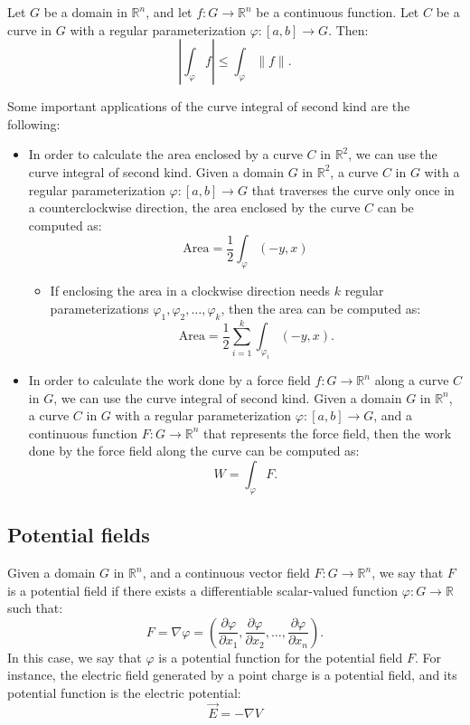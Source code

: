 \begin{prop}
    Let $G$ be a domain in $\mathbb{R}^n$, and let $f : G \to \mathbb{R}^n$ be a continuous function. Let $C$ be a curve in $G$ with a regular parameterization $\varphi : [a, b] \to G$. Then:
    \[
        \left|\int_\varphi f\right| \leq \int_\varphi \|f\|.
    \]
\end{prop}


Some important applications of the curve integral of second kind are the following:
\begin{itemize}
    \item In order to calculate the area enclosed by a curve $C$ in $\mathbb{R}^2$, we can use the curve integral of second kind. Given a domain $G$ in $\mathbb{R}^2$, a curve $C$ in $G$ with a regular parameterization $\varphi : [a, b] \to G$ that traverses the curve only once in a counterclockwise direction, the area enclosed by the curve $C$ can be computed as:
    \[
        \text{Area} = \frac{1}{2} \int_\varphi (-y,x)
    \]
    \begin{itemize}
        \item If enclosing the area in a clockwise direction needs $k$ regular parameterizations $\varphi_1, \varphi_2, \dots, \varphi_k$, then the area can be computed as:
        \[
            \text{Area} = \frac{1}{2} \sum_{i=1}^k \int_{\varphi_i} (-y,x).
        \]
    \end{itemize}

    \item In order to calculate the work done by a force field $f : G \to \mathbb{R}^n$ along a curve $C$ in $G$, we can use the curve integral of second kind. Given a domain $G$ in $\mathbb{R}^n$, a curve $C$ in $G$ with a regular parameterization $\varphi : [a, b] \to G$, and a continuous function $F : G \to \mathbb{R}^n$ that represents the force field, then the work done by the force field along the curve can be computed as:
    \[
        W = \int_\varphi F.
    \]
\end{itemize}


\subsection{Potential fields}

Given a domain $G$ in $\mathbb{R}^n$, and a continuous vector field $F : G \to \mathbb{R}^n$, we say that $F$ is a potential field if there exists a differentiable scalar-valued function $\varphi : G \to \mathbb{R}$ such that:
\[
    F = \nabla \varphi = \left( \frac{\partial \varphi}{\partial x_1}, \frac{\partial \varphi}{\partial x_2}, \dots, \frac{\partial \varphi}{\partial x_n} \right).
\]
In this case, we say that $\varphi$ is a potential function for the potential field $F$. For instance, the electric field generated by a point charge is a potential field, and its potential function is the electric potential:
\[
    \vec{E} = -\nabla V
\]

